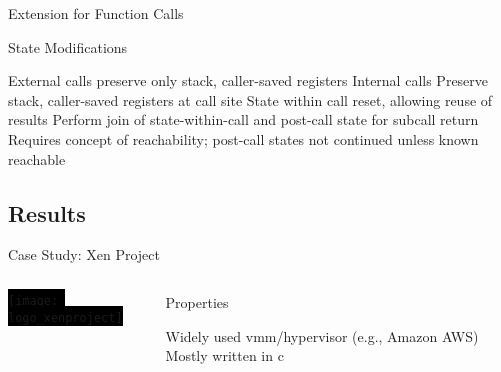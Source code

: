\begin{frame}{Extension for Function Calls}
    \begin{block}{State Modifications}
      \begin{outline}
        \1<+-> External calls preserve only stack, \alert{caller-saved} registers
        \1<+-> Internal calls
          \2 Preserve stack, \alert{caller-saved} registers at call site
          \2 State within call reset, allowing reuse of results
          \2 Perform join of state-within-call and post-call state for subcall return
        \1<+-> Requires concept of \alert{reachability}; post-call states not continued unless known reachable
      \end{outline}
    \end{block}
%
\end{frame}


\subsection{Results}

\begin{frame}{Case Study: Xen Project}
  \begin{columns}
    \colorbox{black}{\texttt{[image: logo\_xenproject]}}

    \begin{block}{Properties}
      \begin{outline}
        \1 Widely used \gls{vmm}/hypervisor (e.g., Amazon AWS)
        \1 Mostly written in \gls{c}
      \end{outline}
    \end{block}
  \end{columns}
\end{frame}

